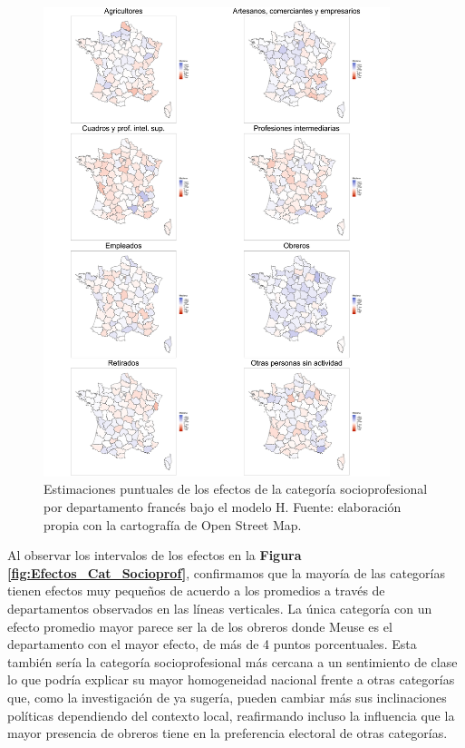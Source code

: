 \begin{figure}[H]
	\centering
	\includegraphics[width = 0.9\textwidth]{Figs/Efectos/Mapa_Efectos_Cat_Socioprof_Modelo_H}
	\caption{Estimaciones puntuales de los efectos de la categoría socioprofesional por departamento francés bajo el modelo H. Fuente: elaboración propia con la cartografía de Open Street Map.}
	\label{fig:Mapa_Efectos_Cat_Socioprof}
\end{figure}

Al observar los intervalos de los efectos en la \textbf{Figura \ref{fig:Efectos_Cat_Socioprof}}, confirmamos que la mayoría de las categorías tienen efectos muy pequeños de acuerdo a los promedios a través de departamentos observados en las líneas verticales. La única categoría con un efecto promedio mayor parece ser la de los obreros donde Meuse es el departamento con el mayor efecto, de más de 4 puntos porcentuales. Esta también sería la categoría socioprofesional más cercana a un sentimiento de clase lo que podría explicar su mayor homogeneidad nacional frente a otras categorías que, como la investigación de \textcite{MayerMichelat81} ya sugería, pueden cambiar más sus inclinaciones políticas dependiendo del contexto local, reafirmando incluso la influencia que la mayor presencia de obreros tiene en la preferencia electoral de otras categorías.\\ 

